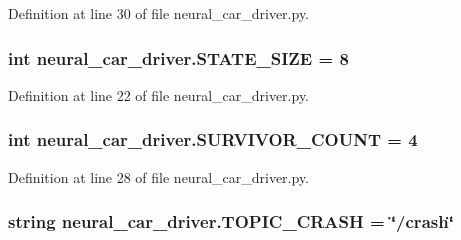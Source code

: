Definition at line 30 of file neural\+\_\+car\+\_\+driver.\+py.

\subsubsection[{\texorpdfstring{S\+T\+A\+T\+E\+\_\+\+S\+I\+ZE}{STATE_SIZE}}]{\setlength{\rightskip}{0pt plus 5cm}int neural\+\_\+car\+\_\+driver.\+S\+T\+A\+T\+E\+\_\+\+S\+I\+ZE = 8}\hypertarget{namespaceneural__car__driver_ac9d3bc133f799be5e8c5c55884d10a8d}{}\label{namespaceneural__car__driver_ac9d3bc133f799be5e8c5c55884d10a8d}


Definition at line 22 of file neural\+\_\+car\+\_\+driver.\+py.

\subsubsection[{\texorpdfstring{S\+U\+R\+V\+I\+V\+O\+R\+\_\+\+C\+O\+U\+NT}{SURVIVOR_COUNT}}]{\setlength{\rightskip}{0pt plus 5cm}int neural\+\_\+car\+\_\+driver.\+S\+U\+R\+V\+I\+V\+O\+R\+\_\+\+C\+O\+U\+NT = 4}\hypertarget{namespaceneural__car__driver_ad40064153991947271d4a197983593fa}{}\label{namespaceneural__car__driver_ad40064153991947271d4a197983593fa}


Definition at line 28 of file neural\+\_\+car\+\_\+driver.\+py.

\subsubsection[{\texorpdfstring{T\+O\+P\+I\+C\+\_\+\+C\+R\+A\+SH}{TOPIC_CRASH}}]{\setlength{\rightskip}{0pt plus 5cm}string neural\+\_\+car\+\_\+driver.\+T\+O\+P\+I\+C\+\_\+\+C\+R\+A\+SH = \char`\"{}/crash\char`\"{}}\hypertarget{namespaceneural__car__driver_a6f5373020b03b73072779ffc5d44482d}{}\label{namespaceneural__car__driver_a6f5373020b03b73072779ffc5d44482d}


